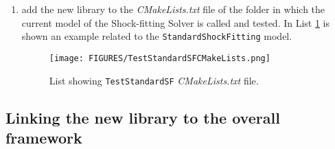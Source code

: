 \documentclass[11pt,a4paper,oneside]{article}
\begin{document}
\begin{enumerate}
{As appears in Lists \ref{fig:dummy component hh} and \ref{fig:dummy component cxx}, the \texttt{DummyComponent} inherits the main \texttt{DummyLibrary} functions (\textit{setup} and \textit{unsetup}) and customizes the key function (\textit{create}) to its purposes (e.g: creating a file with a specified value written inside). 
\newline
To the \texttt{m$\_$file} variable is assigned, automatically, the value named \texttt{.CreatingFile} and specified inside the \textit{input.case}\footnote{in the \textit{input.case} the KEY = VALUE format will be:
\newline
\texttt{.DummyLibrary.DummyComponent.CreatingFile = example.txt}}.
\newline
Following this example other \texttt{DummyLibrarySF} members can be generated.
}
\item{add the new library to the \textit{CMakeLists.txt} file of the folder in which the current model of the Shock-fitting Solver is called and tested. In List \ref{fig:test standard cmakelists} is shown an example related to the \texttt{StandardShockFitting} model.

\begin{figure}[htp]
\center
\texttt{[image: FIGURES/TestStandardSFCMakeLists.png]}
\caption{List showing \texttt{TestStandardSF} \textit{CMakeLists.txt} file.} \label{fig:test standard cmakelists}
\end{figure}
}
\end{enumerate}

\subsection{Linking the new library to the overall framework}
\end{document}

